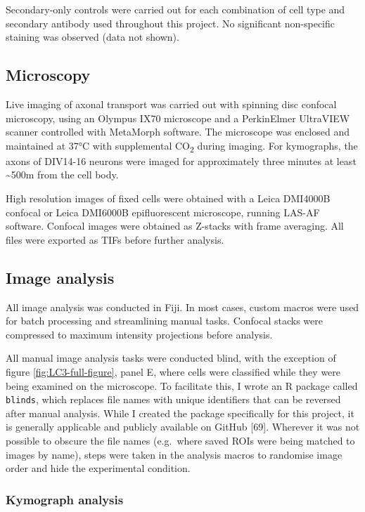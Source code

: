 \documentclass[
  12pt,
  a4paper,
]{book}
\begin{document}
Secondary-only controls were carried out for each combination of cell type and secondary antibody used throughout this project. No significant non-specific staining was observed (data not shown).

\hypertarget{microscopy}{%
\subsection{Microscopy}\label{microscopy}}

Live imaging of axonal transport was carried out with spinning disc confocal microscopy, using an Olympus IX70 microscope and a PerkinElmer UltraVIEW scanner controlled with MetaMorph software. The microscope was enclosed and maintained at 37°C with supplemental CO\textsubscript{2} during imaging. For kymographs, the axons of DIV14-16 neurons were imaged for approximately three minutes at least \textasciitilde500\textmu{}m from the cell body.

High resolution images of fixed cells were obtained with a Leica DMI4000B confocal or Leica DMI6000B epifluorescent microscope, running LAS-AF software. Confocal images were obtained as Z-stacks with frame averaging. All files were exported as TIFs before further analysis.

\hypertarget{image-analysis}{%
\subsection{Image analysis}\label{image-analysis}}

All image analysis was conducted in Fiji. In most cases, custom macros were used for batch processing and streamlining manual tasks. Confocal stacks were compressed to maximum intensity projections before analysis.

All manual image analysis tasks were conducted blind, with the exception of figure \ref{fig:LC3-full-figure}, panel E, where cells were classified while they were being examined on the microscope. To facilitate this, I wrote an R package called \texttt{blinds}, which replaces file names with unique identifiers that can be reversed after manual analysis. While I created the package specifically for this project, it is generally applicable and publicly available on GitHub {[}69{]}. Wherever it was not possible to obscure the file names (e.g.~where saved ROIs were being matched to images by name), steps were taken in the analysis macros to randomise image order and hide the experimental condition.

\hypertarget{kymo}{%
\subsubsection{Kymograph analysis}\label{kymo}}
\end{document}
